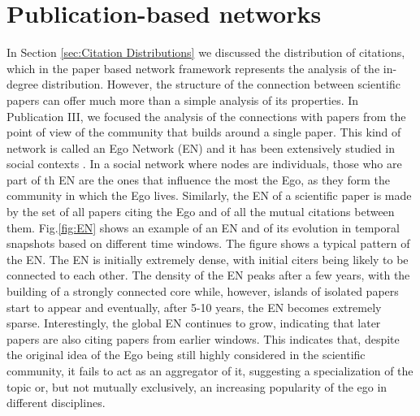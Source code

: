 \section{Publication-based networks}
In Section \ref{sec:Citation Distributions} we discussed the distribution of citations, which in the paper based network framework represents the analysis of the in-degree distribution. However,
the structure of the connection between scientific papers can offer much more than a simple analysis of its properties.
In Publication III, we focused the analysis of the connections with papers from the point of view of the community that builds around a single paper. This kind of network is called an Ego Network (EN) and it has been extensively studied in social contexts \cite{mcauley2012learning,arnaboldi2012analysis}.
In a social network where nodes are individuals, those who are part of th EN are the ones that influence the most the Ego, as they form the community in which the Ego lives. Similarly, the EN of a scientific paper
is made by the set of all papers citing the Ego and of all the mutual citations between them. Fig.\ref{fig:EN} shows an example of an EN and of its evolution in temporal snapshots based on different time windows. The figure
shows a typical pattern of the EN. The EN is initially extremely dense, with initial citers being likely to be connected to each other. The density of the EN peaks after a few years, with the building of a strongly connected core while, however,
islands of isolated papers start to appear and eventually, after 5-10 years, the EN becomes extremely sparse. Interestingly, the global EN continues
to grow, indicating that later papers are also citing papers from earlier windows. This indicates that, despite the original idea of the Ego being still highly considered in the scientific community,
it fails to act as an aggregator of it, suggesting a specialization of the topic or, but not mutually exclusively, an increasing popularity of the ego in different disciplines.


